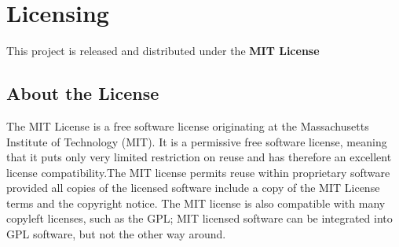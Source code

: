 \documentclass{article}
\begin{document}
\section{Licensing}
This project is released and distributed under the \textbf{MIT License}
\subsection{About the License}
The MIT License is a free software license originating at the Massachusetts Institute of Technology (MIT). It is a permissive free software license, meaning that it puts only very limited restriction on reuse and has therefore an excellent license compatibility.The MIT license permits reuse within proprietary software provided all copies of the licensed software include a copy of the MIT License terms and the copyright notice. The MIT license is also compatible with many copyleft licenses, such as the GPL; MIT licensed software can be integrated into GPL software, but not the other way around.
\end{document}
